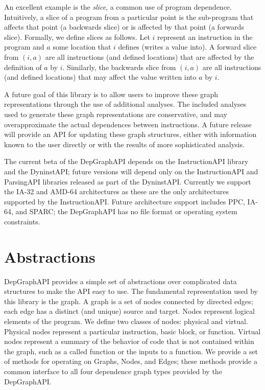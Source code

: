 \documentclass[12pt,titlepage]{article}
\begin{document}
An excellent example is the \emph{slice}, a common use of program
dependence. Intuitively, a slice of a program from a particular point
is the sub-program that affects that point (a backwards slice) or is
affected by that point (a forwards slice). Formally, we define slices
as follows. Let $i$ represent an instruction in the program and $a$
some location that $i$ defines (writes a value into). A forward slice
from $(i,a)$ are all instructions (and defined locations) that are
affected by the definition of $a$ by $i$. Similarly, the backwards
slice from $(i,a)$ are all instructions (and defined locations) that
may affect the value written into $a$ by $i$.

A future goal of this library is to allow users to improve these graph
representations through the use of additional analyses. The included
analyses used to generate these graph representations are
conservative, and may overapproximate the actual dependences between
instructions. A future release will provide an API for updating these
graph structures, either with information known to the user directly
or with the results of more sophisticated analysis.

The current beta of the DepGraphAPI depends on the InstructionAPI library
and the DyninstAPI; future versions will depend only on the
InstructionAPI and ParsingAPI libraries released as part of the
DyninstAPI. Currently we support the IA-32 and AMD-64 architectures as
these are the only architectures supported by the
InstructionAPI. Future architecture support includes PPC, IA-64, and
SPARC; the DepGraphAPI has no file format or operating system
constraints.

\section{Abstractions}

DepGraphAPI provides a simple set of abstractions over complicated
data structures to make the API easy to use. The fundamental
representation used by this library is the graph. A graph is a set of
nodes connected by directed edges; each edge has a distinct (and
unique) source and target. Nodes represent logical elements of the
program. We define two classes of nodes: physical and
virtual. Physical nodes represent a particular instruction, basic
block, or function. Virtual nodes represent a summary of the behavior
of code that is not contained within the graph, such as a called
function or the inputs to a function. We provide a set of methods for
operating on Graphs, Nodes, and Edges; these methods provide a common
interface to all four dependence graph types provided by the
DepGraphAPI.
\end{document}
